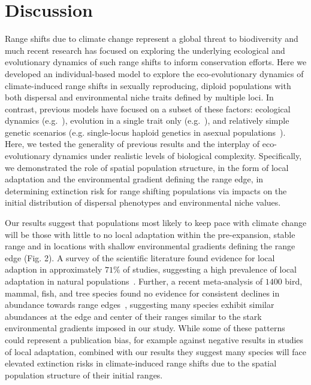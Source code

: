 \documentclass[12pt, oneside]{article}
\begin{document}
\section*{Discussion}
Range shifts due to climate change represent a global threat to biodiversity and much recent research has focused on exploring the underlying ecological and evolutionary dynamics of such range shifts to inform conservation efforts. Here we developed an individual-based model to explore the eco-evolutionary dynamics of climate-induced range shifts in sexually reproducing, diploid populations with both dispersal and environmental niche traits defined by multiple loci. In contrast, previous models have focused on a subset of these factors: ecological dynamics (e.g.~\citep{brooker2007modelling}), evolution in a single trait only (e.g.~\citep{atkins2010local, henry2013eco}), and relatively simple genetic scenarios (e.g. single-locus haploid genetics in asexual populations~\citep{boeye2013more, hargreaves2015fitness}).  Here, we tested the generality of previous results and the interplay of eco-evolutionary dynamics under realistic levels of biological complexity. Specifically, we demonstrated the role of spatial population structure, in the form of local adaptation and the environmental gradient defining the range edge, in determining extinction risk for range shifting populations via impacts on the initial distribution of dispersal phenotypes and environmental niche values.

Our results suggest that populations most likely to keep pace with climate change will be those with little to no local adaptation within the pre-expansion, stable range and in locations with shallow environmental gradients defining the range edge (Fig. 2). A survey of the scientific literature found evidence for local adaption in approximately $71\%$ of studies, suggesting a high prevalence of local adaptation in natural populations~\citep{hereford2009quantitative}. Further, a recent meta-analysis of $1400$ bird, mammal, fish, and tree species found no evidence for consistent declines in abundance towards range edges~\citep{dallas2017species}, suggesting many species exhibit similar abundances at the edge and center of their ranges similar to the stark environmental gradients imposed in our study. While some of these patterns could represent a publication bias, for example against negative results in studies of local adaptation, combined with our results they suggest many species will face elevated extinction risks in climate-induced range shifts due to the spatial population structure of their initial ranges.
\end{document}
